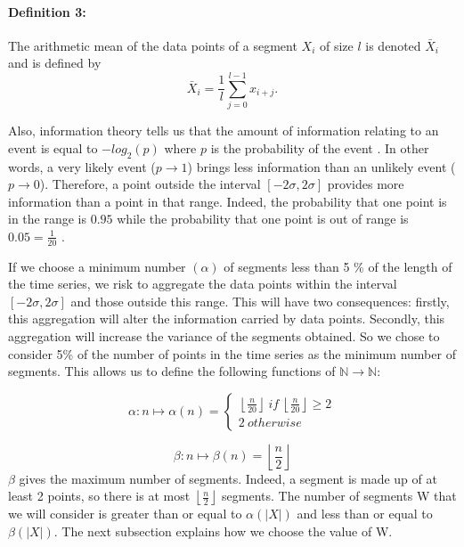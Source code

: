\paragraph{Definition 3:} The arithmetic mean of the data points of a segment $ X_{i} $ of size $ l $ is
denoted $ \bar {X}_{i} $ and is defined by
\[
\bar{X}_{i} = \frac{1}{l} \sum_{j = 0}^{l-1} x_{i + j}.
\]




Also, information theory tells us that the amount of information relating to an event is equal to $ -log_{2}(p) $ where $ p $ is the probability of the event
\cite{Shannon2001} . In other words, a very likely event ($ p \longrightarrow1 $) brings less information than an unlikely event ($ p \longrightarrow0 $). Therefore, a point outside the interval $ [- 2 \sigma, 2 \sigma] $ provides more information than a point in that range. Indeed, the probability that one point is in the range is $ 0.95$ while the probability that one point is out of range is $ 0.05 = \frac{1}{20} $ .


If we choose a minimum number $ (\alpha) $ of segments less than 5 \% of the length of the time series, we risk to aggregate the data points within the interval $ [- 2 \sigma, 2 \sigma] $ and those outside this range. This will have two consequences: firstly, this aggregation will alter the information carried by data points. Secondly, this aggregation will increase the variance of the segments obtained. So we chose to  consider 5\% of the number of points in the time series as the minimum number of segments. This allows us to define the following functions of $ \mathbb{N} \rightarrow \mathbb{N} $:

\[
\alpha: n \mapsto \alpha(n) = \left \{
\begin{array}{c}
\left \lfloor \frac{n}{20} \right \rfloor \: if \: \left \lfloor \frac{n}{20} \right \rfloor \geq 2 \\
2 \: otherwise
\end{array} 
\right.
\]



\[
\beta: n \mapsto \beta(n) = \left \lfloor \frac{n}{2} \right \rfloor
\]
 $ \beta $ gives the maximum number of segments. Indeed, a segment is made up of at least 2 points, so there is at most $ \left \lfloor
\frac{n}{2} \right \rfloor $ segments. The number of segments W that we will consider is greater than or equal to $ \alpha (| X |) $ and less than or equal to $ \beta (| X |) $. The next subsection explains how we choose the value of W.

